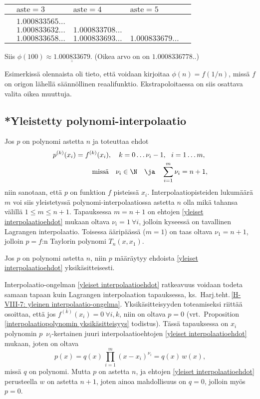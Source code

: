 \begin{center}
\begin{tabular}{lllll}
& $\text{aste}=3$ & $\text{aste}=4$ & $\text{aste}=5$ \\ \hline \\
& $1.000833565\ldots$ \\
& $1.000833632\ldots$ & $1.000833708\ldots$ \\
& $1.000833658\ldots$ & $1.000833693\ldots$ & $1.000833679\ldots$
\end{tabular}
\end{center}
Siis $\phi(100)\approx\underline{\underline{1.000833679}}$. (Oikea arvo on on $1.0008336778..$)
\loppu

Esimerkissä olennaista oli tieto, että voidaan kirjoitaa $\phi(n)=f(1/n)$, missä $f$ on origon 
lähellä säännöllinen reaalifunktio. Ekstrapoloitaessa on siis osattava valita oikea muuttuja.

\subsection{*Yleistetty polynomi-interpolaatio}

Jos $p$ on polynomi astetta $n$ ja toteuttaa ehdot
\begin{equation} \label{yleiset interpolaatioehdot} 
\begin{aligned}
p^{(k)}(x_i) &= f^{(k)}(x_i),\quad k=0\ldots\nu_i-1,\ \ i=1\ldots m, \\ 
             &\qquad\ \text{missä}\quad \nu_i \in \N \quad \ja \quad \sum_{i=1}^m \nu_i=n+1,
\end{aligned} \end{equation}
niin sanotaan, että $p$ on funktion $f$  pisteissä
$x_i$. Interpolaatiopisteiden lukumäärä $m$ voi siis yleistetyssä polynomi-interpolaatiossa
astetta $n$ olla mikä tahansa välillä $1 \le m \le n+1$. Tapauksessa $m=n+1$ on ehtojen
\eqref{yleiset interpolaatioehdot} mukaan oltava $\nu_i=1\ \forall i$, jolloin kyseessä on 
tavallinen Lagrangen interpolaatio. Toisessa ääripäässä ($m=1$) on taas oltava $\nu_1=n+1$, 
jolloin $p =f$:n Taylorin polynomi $T_n(x,x_1)$.
\begin{Prop} Jos $p$ on polynomi astetta $n$, niin $p$ määräytyy ehdoista 
\eqref{yleiset interpolaatioehdot} yksikäsitteisesti. 
\end{Prop}
\tod Interpolaatio-ongelman \eqref{yleiset interpolaatioehdot} ratkeavuus voidaan todeta
samaan tapaan kuin Lagrangen interpolaation tapauksessa, ks.\
Harj.teht.\,\ref{H-VIII-7: yleinen interpolaatio-ongelma}. Yksikäsitteisyyden toteamiseksi
riittää osoittaa, että jos $f^{(k)}(x_i)=0\ \forall i,k$, niin on oltava $p=0$
(vrt.\ Proposition \ref{interpolaatiopolynomin yksikäsitteisyys} todistus). Tässä tapauksessa
on $x_i$  polynomin $p$ $\,\nu_i$-kertainen juuri interpolaatioehtojen
\eqref{yleiset interpolaatioehdot} mukaan, joten on oltava
\[ 
p(x) = q(x)\,\prod_{i=1}^m (x-x_i)^{\nu_i} = q(x)\,w(x), 
\]
missä $q$ on polynomi. Mutta $p$ on astetta $n$, ja ehtojen \eqref{yleiset interpolaatioehdot}
perusteella $w$ on astetta $n+1$, joten ainoa mahdollisuus on $q=0$, jolloin myös $p=0$.
\loppu

